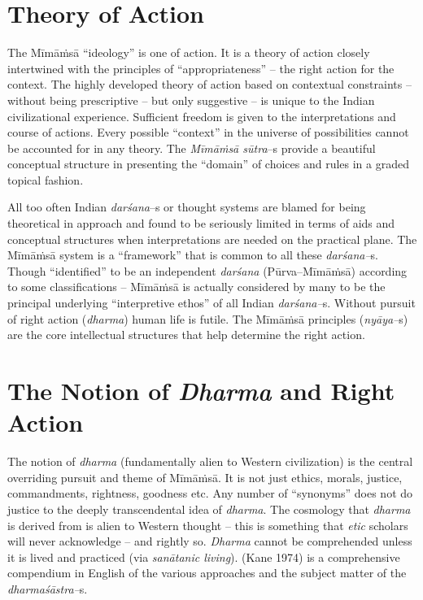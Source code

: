 \section*{Theory of Action}

The Mīmāṁsā “ideology” is one of action. It is a theory of action closely intertwined with the principles of “appropriateness” – the right action for the context. The highly developed theory of action based on contextual constraints – without being prescriptive – but only suggestive – is unique to the Indian civilizational experience. Sufficient freedom is given to the interpretations and course of actions. Every possible “context” in the universe of possibilities cannot be accounted for in any theory. The \textit{Mīmāṁsā sūtra}–s provide a beautiful conceptual structure in presenting the “domain” of choices and rules in a graded topical fashion.

All too often Indian \textit{darśana}–s or thought systems are blamed for being theoretical in approach and found to be seriously limited in terms of aids and conceptual structures when interpretations are needed on the practical plane. The Mīmāṁsā system is a “framework” that is common to all these \textit{darśana–}s. Though “identified” to be an independent \textit{darśana} (Pūrva–Mīmāṁsā) according to some classifications – Mīmāṁsā is actually considered by many to be the principal underlying “interpretive ethos” of all Indian \textit{darśana–}s. Without pursuit of right action (\textit{dharma}) human life is futile. The Mīmāṁsā principles (\textit{nyāya–}s) are the core intellectual structures that help determine the right action.


\section*{The Notion of \textit{Dharma} and Right Action}

The notion of \textit{dharma} (fundamentally alien to Western civilization) is the central overriding pursuit and theme of Mīmāṁsā. It is not just ethics, morals, justice, commandments, rightness, goodness etc. Any number of “synonyms” does not do justice to the deeply transcendental idea of \textit{dharma}. The cosmology that \textit{dharma} is derived from is alien to Western thought – this is something that \textit{etic} scholars will never acknowledge – and rightly so. \textit{Dharma} cannot be comprehended unless it is lived and practiced (via \textit{sanātanic living}). (Kane 1974) is a comprehensive compendium in English of the various approaches and the subject matter of the \textit{dharmaśāstra–}s.

